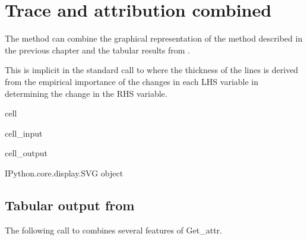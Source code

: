 \documentclass[letterpaper,10pt,english]{jupyterBook}
\begin{document}
\section{Trace and attribution combined}
\label{\detokenize{content/06_ModelAnalytics/AttributionSomeFeatures:trace-and-attribution-combined}}
\sphinxAtStartPar
The  method can combine the graphical representation of the  method described in the previous chapter and the tabular results from .

\sphinxAtStartPar
This is implicit in the standard call to where the thickness of the lines is derived from the empirical importance of the changes in each LHS variable in determining the change in the RHS variable.

\begin{sphinxuseclass}{cell}\begin{sphinxVerbatimInput}

\begin{sphinxuseclass}{cell_input}
\begin{sphinxVerbatim}[commandchars=\\\{\}]
\end{sphinxVerbatim}

\end{sphinxuseclass}\end{sphinxVerbatimInput}
\begin{sphinxVerbatimOutput}

\begin{sphinxuseclass}{cell_output}
\begin{sphinxVerbatim}[commandchars=\\\{\}]
\PYGZlt{}IPython.core.display.SVG object\PYGZgt{}
\end{sphinxVerbatim}

\end{sphinxuseclass}\end{sphinxVerbatimOutput}

\end{sphinxuseclass}

\subsection{Tabular output from }
\label{\detokenize{content/06_ModelAnalytics/AttributionSomeFeatures:tabular-output-from-tracepre}}
\sphinxAtStartPar
The following call to  combines several features of Get\_attr.
\end{document}
